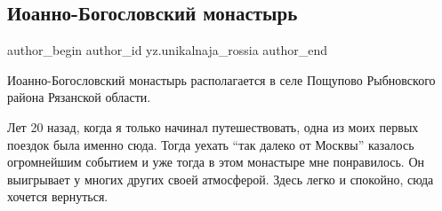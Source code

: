  
 
 
 
 
 
\subsection{Иоанно-Богословский монастырь}
\label{sec:27_01_2022.yz.unikalnaja_rossia.1.ioanno_bogoslovskij_monastyr}
 
\ifcmt
 author_begin
   author_id yz.unikalnaja_rossia
 author_end
\fi

Иоанно-Богословский монастырь располагается в селе Пощупово Рыбновского района
Рязанской области.

Лет 20 назад, когда я только начинал путешествовать, одна из моих первых
поездок была именно сюда. Тогда уехать \enquote{так далеко от Москвы} казалось
огромнейшим событием и уже тогда в этом монастыре мне понравилось. Он
выигрывает у многих других своей атмосферой. Здесь легко и спокойно, сюда
хочется вернуться.
